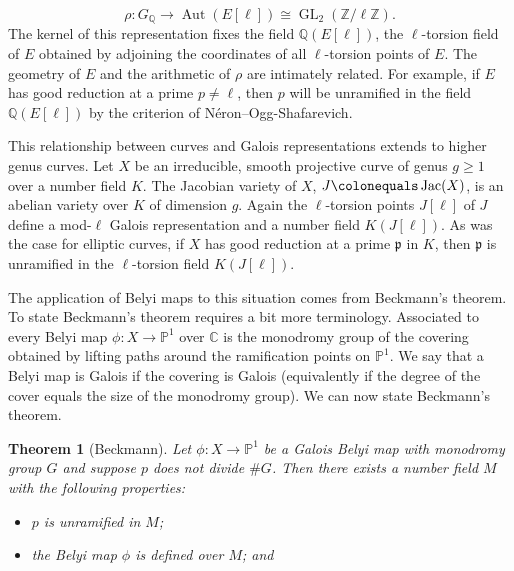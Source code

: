 \documentclass{dcthesis}
\newcommand{\PP}{\mathbb P}
\newcommand{\CC}{\mathbb C}
\newcommand{\QQ}{\mathbb Q}
\newcommand{\ZZ}{\mathbb Z}
\newcommand{\defi}[1]{\textsf{#1}}
\DeclareMathOperator{\Aut}{Aut}
\DeclareMathOperator{\GL}{GL}
\DeclareMathOperator{\Jac}{Jac}
\numberwithin{equation}{section}
\newtheorem{theorem}[equation]{Theorem}
\theoremstyle{definition}
\theoremstyle{remark}
\begin{document}
{{{    \begin{equation}
      \label{eqn:modlgalois}
      \rho\colon
      G_\QQ\to
      \Aut(E[\ell])\cong
      \GL_2(\ZZ/\ell\ZZ).
    \end{equation}
    The kernel of this
    representation fixes the field
    $\QQ(E[\ell])$,
    the
    $\ell$-torsion field of $E$
    obtained by adjoining the coordinates
    of all $\ell$-torsion points of $E$.
    The geometry of $E$ and the arithmetic
    of $\rho$ are intimately related.
    For example,
    if $E$ has good reduction at a prime $p\neq\ell$,
    then $p$ will be unramified in
    the field $\QQ(E[\ell])$
    by the criterion of
    N\'{e}ron--Ogg-Shafarevich.
    \par
    This relationship between curves and Galois
    representations extends to higher genus
    curves.
    Let $X$ be an
    irreducible, smooth projective
    curve
    of genus $g\geq 1$
    over a number field $K$.
    The Jacobian variety of $X$,
    $J\colonequals \Jac(X)$,
    is an abelian variety over $K$
    of dimension $g$.
    Again the $\ell$-torsion points
    $J[\ell]$ of $J$
    define a mod-$\ell$ Galois representation
    and a number field $K(J[\ell])$.
    As was the case for elliptic curves,
    if $X$ has good reduction at a prime
    $\mathfrak{p}$ in $K$,
    then $\mathfrak{p}$ is unramified in
    the $\ell$-torsion field
    $K(J[\ell])$.
    \par
    The application of Belyi maps to this
    situation comes from Beckmann's theorem.
    To state Beckmann's theorem requires
    a bit more terminology.
    Associated to every Belyi map
    $\phi\colon X\to\PP^1$
    over $\CC$
    is the \defi{monodromy group}
    of the covering
    obtained by lifting paths around
    the ramification points on $\PP^1$.
    We say that a Belyi map is
    \defi{Galois} if the covering is Galois
    (equivalently if the degree
    of the cover equals the size
    of the monodromy group).
    We can now state Beckmann's theorem.
    \begin{theorem}[Beckmann]
      \label{thm:beckmann}
      Let $\phi\colon X\to\PP^1$
      be a Galois Belyi map with
      monodromy group $G$
      and suppose $p$ does not divide $\# G$.
      Then there exists a number field $M$
      with the following properties:
      \begin{itemize}
        \item
          $p$ is unramified in $M$;
        \item
          the Belyi map $\phi$ is defined over $M$; and

\end{itemize}
\end{theorem}}}}
\end{document}

